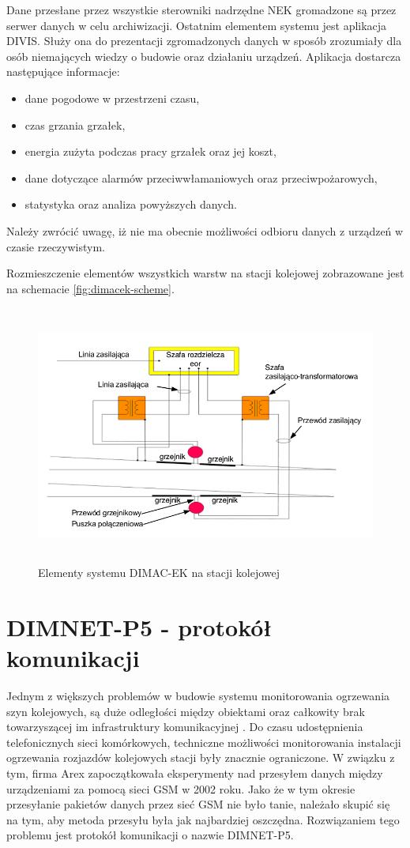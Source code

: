 Dane przesłane przez wszystkie sterowniki nadrzędne NEK gromadzone są przez serwer danych w celu archiwizacji. Ostatnim elementem systemu jest aplikacja DIVIS. Służy ona do prezentacji zgromadzonych danych w sposób zrozumiały dla osób niemających wiedzy o budowie oraz działaniu urządzeń. Aplikacja dostarcza następujące informacje:


\begin{itemize}
\item dane pogodowe w przestrzeni czasu,
\item czas grzania grzałek,
\item energia zużyta podczas pracy grzałek oraz jej koszt,
\item dane dotyczące alarmów przeciwwłamaniowych oraz przeciwpożarowych,
\item statystyka oraz analiza powyższych danych.
\end{itemize}

Należy zwrócić uwagę, iż nie ma obecnie możliwości odbioru danych z urządzeń w czasie rzeczywistym.

Rozmieszczenie elementów wszystkich warstw na stacji kolejowej zobrazowane jest na schemacie \ref{fig:dimacek-scheme}.

\begin{figure}[t]
	\includegraphics[height=85mm]{./img/dimacek_tory.png}
	\caption{Elementy systemu DIMAC-EK na stacji kolejowej}
	\label{fig:dimacek_tory}
\end{figure}

\section{DIMNET-P5 - protokół komunikacji}
Jednym z większych problemów w budowie systemu monitorowania ogrzewania szyn kolejowych, są duże odległości między obiektami oraz całkowity brak towarzyszącej im infrastruktury komunikacyjnej \cite{dimnetp5-spec}. Do czasu udostępnienia telefonicznych sieci komórkowych, techniczne możliwości monitorowania instalacji ogrzewania rozjazdów kolejowych stacji były znacznie ograniczone. W związku z tym, firma Arex zapoczątkowała eksperymenty nad przesyłem danych między urządzeniami za pomocą sieci GSM w 2002 roku. Jako że w tym okresie przesyłanie pakietów danych przez sieć GSM nie było tanie, należało skupić się na tym, aby metoda przesyłu była jak najbardziej oszczędna. Rozwiązaniem tego problemu jest protokół komunikacji o nazwie DIMNET-P5.

